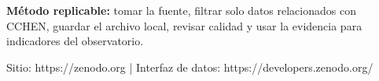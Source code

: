 \documentclass[9pt,a4paper]{extarticle}
\begin{document}
\vspace{0.06cm}
\begin{tcolorbox}[enhanced,colback=white,colframe=cchenpurple!55,boxrule=0.45pt,arc=2pt,left=6pt,right=6pt,top=5pt,bottom=5pt]
{\bfseries\color{cchenpurple}Método replicable:} tomar la fuente, filtrar solo datos relacionados con CCHEN, guardar el archivo local, revisar calidad y usar la evidencia para indicadores del observatorio.
\end{tcolorbox}

\vspace{0.02cm}
{\scriptsize\color{mutedgray}Sitio: https://zenodo.org \quad | \quad Interfaz de datos: https://developers.zenodo.org/}
\end{document}

